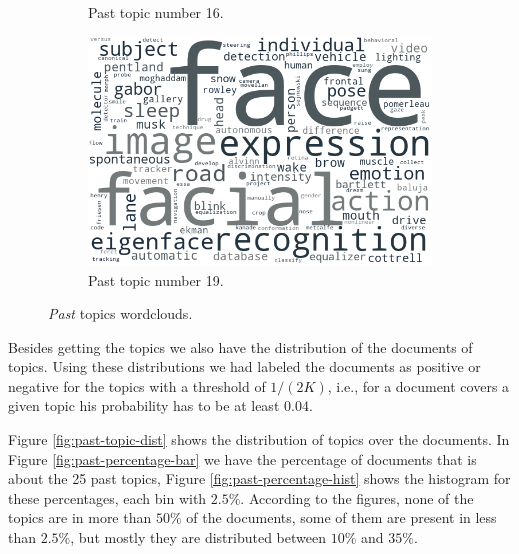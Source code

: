 \begin{figure}[h!]
\begin{subfigure}{0.49\textwidth}
		\caption{Past topic number 16.}
	\end{subfigure}%
	\hfill
	\begin{subfigure}{0.49\textwidth}
		\includegraphics[width=\linewidth]{01.Chapters/05.Results/past_19}
		\caption{Past topic number 19.}
	\end{subfigure}%
	\caption{\textit{Past} topics wordclouds.}
	\label{fig:past-wordcloud}
\end{figure}

Besides getting the topics we also have the distribution of the documents of topics. Using these distributions we had labeled the documents as positive or negative for the topics with a threshold of $1 / (2 K)$, i.e., for a document covers a given topic his probability has to be at least $0.04$.

Figure \ref{fig:past-topic-dist} shows the distribution of topics over the documents. In Figure \ref{fig:past-percentage-bar} we have the percentage of documents that is about the 25 past topics, Figure \ref{fig:past-percentage-hist} shows the histogram for these percentages, each bin with $2.5\%$. According to the figures, none of the topics are in more than $50\%$ of the documents, some of them are present in less than $2.5\%$, but mostly they are distributed between $10\%$ and $35\%$.

